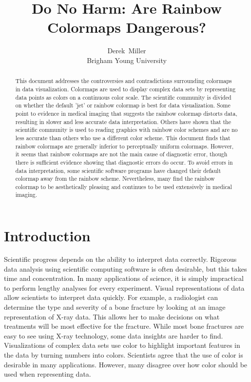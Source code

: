 \documentclass[journal,12pt]{IEEEtran}
\title{Do No Harm: Are Rainbow Colormaps Dangerous? \\}
\author{Derek~Miller \\ Brigham Young University}%
\begin{document}
\begin{titlepage}
\maketitle
\thispagestyle{empty}

\begin{abstract}
This document addresses the controversies and contradictions
surrounding colormaps in data visualization.
Colormaps are used to display complex data sets by
representing data points as colors on a continuous color scale. The scientific
community is divided on whether the default 'jet' or rainbow colormap
is best for data visualization. Some point to evidence in medical imaging
that suggests the rainbow colormap distorts data, resulting in slower and 
less accurate data interpretation. Others have shown that the
scientific community is used to reading graphics with rainbow
color schemes and are no less accurate than others who use
a different color scheme. This document finds that rainbow colormaps
are generally inferior to perceptually uniform colormaps. However, it
seems that rainbow colormaps are not the main cause of diagnostic error,
though there is sufficient evidence showing that diagnostic errors do occur.
To avoid errors in data interpretation, some scientific software programs
have changed their default colormap away from the rainbow scheme.
Nevertheless, many find the rainbow colormap to be aesthetically pleasing
and continues to be used extensively in medical imaging.
\end{abstract}
\tableofcontents
\vspace*{\fill}
\end{titlepage}

\IEEEpeerreviewmaketitle

\section{Introduction}

Scientific progress depends on the ability to interpret data correctly. Rigorous data analysis
using scientific computing software is often desirable, but this takes time and concentration.
In many applications of science, it is simply impractical to perform lengthy analyses for every
experiment. Visual representations of data
allow scientists to interpret data quickly.
For example, a radiologist can determine the
type and severity of a bone fracture by looking at an
image representation of X-ray data. This allows her to make decisions on what treatments will be most effective
for the fracture. While most bone fractures are easy to see using X-ray technology, some data insights are
harder to find. Visualizations of complex data sets use color to highlight important features
in the data by turning numbers into colors. Scientists agree that the use of color is desirable in many applications.
However, many disagree over how color should be used when representing data.
\end{document}
